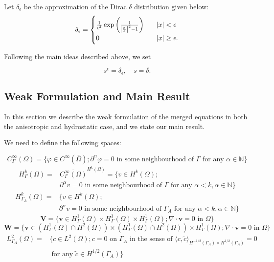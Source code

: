\documentclass[11pt]{article}
\begin{document}
Let $\delta_\epsilon$ be the approximation of the Dirac $\delta$ distribution given below:
%
\begin{equation} \label{delta_eps_source_def}
\delta_\epsilon = 
\begin{cases}
\frac{1}{\epsilon^3} \exp{\bigg ( \frac{1}{\abs{{\frac{x}{\epsilon}}}^2-1} \bigg ) } &\quad \abs{x} < \epsilon \\
0 &\quad \abs{x} \geq \epsilon. \\
\end{cases}
\end{equation}

Following the main ideas described above, we set

\begin{equation}
s^\epsilon = \delta_\epsilon, \quad s = \delta.
\end{equation}

\subsection{Weak Formulation and Main Result} \label{weakformulationmainresult}

In this section we describe the weak formulation of the merged equations in both the anisotropic and hydrostatic case, and we state our main result.

We need to define the following spaces:

\[ C^{\infty}_\Gamma (\Omega) = \{ \varphi \in C^\infty (\bar{\Omega}); \partial^\alpha \varphi = 0 \text{ in some neighbourhood of } \Gamma \text{ for any } \alpha \in \mathbb{N} \} \]
%
\begin{align}
H^k_{\Gamma} (\Omega) = & \overline{C_\Gamma ^ \infty (\Omega)} ^ {H^k (\Omega)} = \{ v \in H^k(\Omega); \nonumber \\
& \partial^\alpha v=0 \text{ in some neighbourhood of } \Gamma \text{ for any } \alpha < k, \alpha \in \mathbb{N} \nonumber \}
\end{align}
%
\begin{align}
H^k_{\Gamma_A} (\Omega) = & \{ v \in H^k(\Omega); \nonumber \\
& \partial^\alpha v=0 \text{ in some neighbourhood of } \Gamma_A \text{ for any } \alpha < k, \alpha \in \mathbb{N} \nonumber \}
\end{align}
%
\[ \mathbf{V} = \{ \mathbf{v} \in H^1_{\Gamma} (\Omega) \times H^1_{\Gamma} (\Omega) \times H^1_{\Gamma} (\Omega); \nabla \cdot \mathbf{v} = 0 \text{ in } \Omega \} \]
%
\[ \mathbf{W} = \{ \mathbf{v} \in (H^1_{\Gamma} (\Omega) \cap H^2(\Omega)) \times (H^1_{\Gamma} (\Omega) \cap H^2(\Omega)) \times H^1_{\Gamma} (\Omega); \nabla \cdot \mathbf{v} = 0 \text{ in } \Omega \} \]
%
\begin{align}
L^2_{\Gamma_A}(\Omega) = & \{ c \in L^2(\Omega); c = 0 \text{ on } \Gamma_A \text{ in the sense of } \langle c , \tilde{c} \rangle_{H^{-1/2} (\Gamma_A) \times H^{1/2} (\Gamma_A)} = 0 \nonumber \\
& \text{ for any } \tilde{c} \in H^{1/2}(\Gamma_A) \nonumber \}
\end{align}
\end{document}
